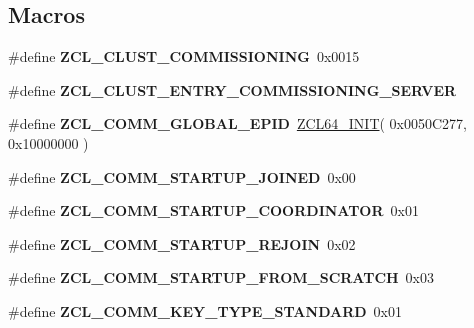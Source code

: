 \subsection*{Macros}
\begin{DoxyCompactItemize}
\item 
\mbox{\label{group__zcl__commissioning_ga547cd138961d72d75ec09224e7777ed7}} 
\#define {\bfseries Z\+C\+L\+\_\+\+C\+L\+U\+S\+T\+\_\+\+C\+O\+M\+M\+I\+S\+S\+I\+O\+N\+I\+NG}~0x0015
\item 
\#define {\bfseries Z\+C\+L\+\_\+\+C\+L\+U\+S\+T\+\_\+\+E\+N\+T\+R\+Y\+\_\+\+C\+O\+M\+M\+I\+S\+S\+I\+O\+N\+I\+N\+G\+\_\+\+S\+E\+R\+V\+ER}
\item 
\mbox{\label{group__zcl__commissioning_ga7e7f7c1abfa0734e79a0e1dbfc053faa}} 
\#define {\bfseries Z\+C\+L\+\_\+\+C\+O\+M\+M\+\_\+\+G\+L\+O\+B\+A\+L\+\_\+\+E\+P\+ID}~\hyperlink{group__zcl__64_ga8e855e53988a32f4428ceacce4f9870c}{Z\+C\+L64\+\_\+\+I\+N\+IT}( 0x0050\+C277, 0x10000000 )
\item 
\mbox{\label{group__zcl__commissioning_ga65e717b887be7667a9c003fd3dfffcdd}} 
\#define {\bfseries Z\+C\+L\+\_\+\+C\+O\+M\+M\+\_\+\+S\+T\+A\+R\+T\+U\+P\+\_\+\+J\+O\+I\+N\+ED}~0x00
\item 
\mbox{\label{group__zcl__commissioning_gadd01d1d0543cc7329332fe06ceba4e48}} 
\#define {\bfseries Z\+C\+L\+\_\+\+C\+O\+M\+M\+\_\+\+S\+T\+A\+R\+T\+U\+P\+\_\+\+C\+O\+O\+R\+D\+I\+N\+A\+T\+OR}~0x01
\item 
\mbox{\label{group__zcl__commissioning_gac6430290e70952064a72a9cbd5136081}} 
\#define {\bfseries Z\+C\+L\+\_\+\+C\+O\+M\+M\+\_\+\+S\+T\+A\+R\+T\+U\+P\+\_\+\+R\+E\+J\+O\+IN}~0x02
\item 
\mbox{\label{group__zcl__commissioning_gaa3914948a2024dab2b0ae5f3ff8ae5e7}} 
\#define {\bfseries Z\+C\+L\+\_\+\+C\+O\+M\+M\+\_\+\+S\+T\+A\+R\+T\+U\+P\+\_\+\+F\+R\+O\+M\+\_\+\+S\+C\+R\+A\+T\+CH}~0x03
\item 
\mbox{\label{group__zcl__commissioning_gad7f5d4706a3fa18605030c3811076c29}} 
\#define {\bfseries Z\+C\+L\+\_\+\+C\+O\+M\+M\+\_\+\+K\+E\+Y\+\_\+\+T\+Y\+P\+E\+\_\+\+S\+T\+A\+N\+D\+A\+RD}~0x01

\end{DoxyCompactItemize}
